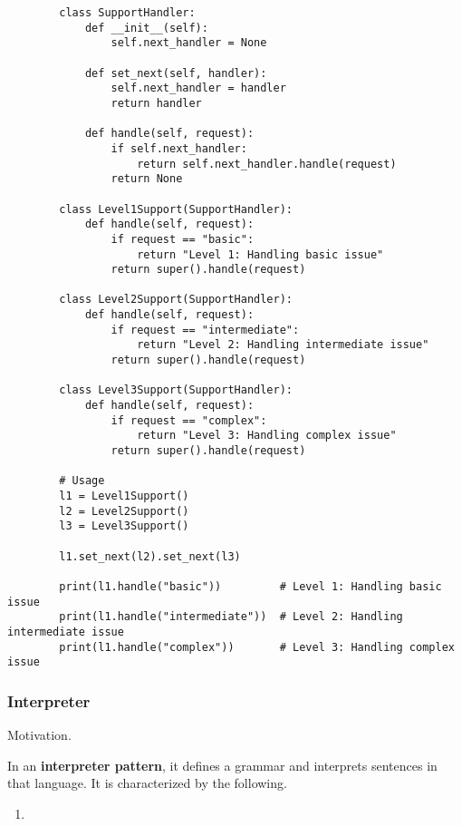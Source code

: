     \begin{example}
      \begin{lstlisting}
        class SupportHandler:
            def __init__(self):
                self.next_handler = None
            
            def set_next(self, handler):
                self.next_handler = handler
                return handler
            
            def handle(self, request):
                if self.next_handler:
                    return self.next_handler.handle(request)
                return None

        class Level1Support(SupportHandler):
            def handle(self, request):
                if request == "basic":
                    return "Level 1: Handling basic issue"
                return super().handle(request)

        class Level2Support(SupportHandler):
            def handle(self, request):
                if request == "intermediate":
                    return "Level 2: Handling intermediate issue"
                return super().handle(request)

        class Level3Support(SupportHandler):
            def handle(self, request):
                if request == "complex":
                    return "Level 3: Handling complex issue"
                return super().handle(request)

        # Usage
        l1 = Level1Support()
        l2 = Level2Support()
        l3 = Level3Support()

        l1.set_next(l2).set_next(l3)

        print(l1.handle("basic"))         # Level 1: Handling basic issue
        print(l1.handle("intermediate"))  # Level 2: Handling intermediate issue
        print(l1.handle("complex"))       # Level 3: Handling complex issue 
      \end{lstlisting}
    \end{example}

  \subsubsection{Interpreter}

    Motivation. 

    \begin{definition}
      In an \textbf{interpreter pattern}, it defines a grammar and interprets sentences in that language. It is characterized by the following. 
      \begin{enumerate}
        \item 
      \end{enumerate}
    \end{definition}

